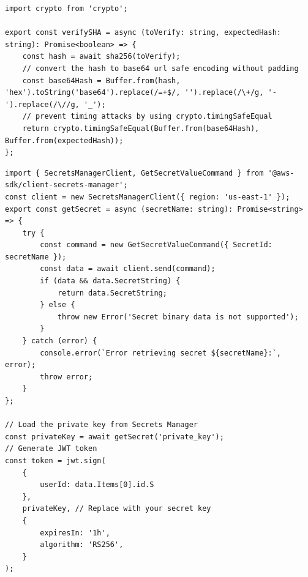\begin{lstlisting}[style=typescript,caption=Code Challenge Timing safe comparisons,label=apendix:timing_safe_comparions]
import crypto from 'crypto';

export const verifySHA = async (toVerify: string, expectedHash: string): Promise<boolean> => {
    const hash = await sha256(toVerify);
    // convert the hash to base64 url safe encoding without padding
    const base64Hash = Buffer.from(hash, 'hex').toString('base64').replace(/=+$/, '').replace(/\+/g, '-').replace(/\//g, '_');
    // prevent timing attacks by using crypto.timingSafeEqual
    return crypto.timingSafeEqual(Buffer.from(base64Hash), Buffer.from(expectedHash));
};
\end{lstlisting}

\newpage

\begin{lstlisting}[style=typescript,caption=Token Signature using Assymetric key with RS256 stored in Secrets Manager,label=apendix:token_signing]
import { SecretsManagerClient, GetSecretValueCommand } from '@aws-sdk/client-secrets-manager';
const client = new SecretsManagerClient({ region: 'us-east-1' });
export const getSecret = async (secretName: string): Promise<string> => {
    try {
        const command = new GetSecretValueCommand({ SecretId: secretName });
        const data = await client.send(command);
        if (data && data.SecretString) {
            return data.SecretString;
        } else {
            throw new Error('Secret binary data is not supported');
        }
    } catch (error) {
        console.error(`Error retrieving secret ${secretName}:`, error);
        throw error;
    }
};

// Load the private key from Secrets Manager
const privateKey = await getSecret('private_key');
// Generate JWT token
const token = jwt.sign(
    {
        userId: data.Items[0].id.S
    },
    privateKey, // Replace with your secret key
    {
        expiresIn: '1h',
        algorithm: 'RS256',
    }
);

\end{lstlisting}


